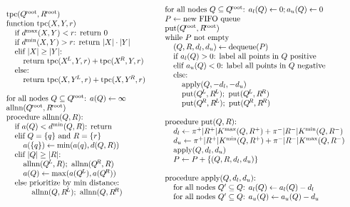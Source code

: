 \documentclass{article}
\newcommand{\disthrectmin}{d^{\min}}
\newcommand{\disthrectmax}{d^{\max}}
\newcommand{\dist}[2]{d(#1,#2)}
\newcommand{\kdroot}[1]{#1^{\!\text{root}}}
\newcommand{\kdleft}[1]{#1^{\!L}}
\newcommand{\kdright}[1]{#1^{\!R}}
\newcommand{\al}{a_l}
\newcommand{\au}{a_u}
\newcommand{\dl}{d_l}
\newcommand{\du}{d_u}
\newcommand{\x}{\\ \hspace{0.15in}}
\newcommand{\xx}{\\ \hspace{0.3in}}
\newcommand{\xxx}{\\ \hspace{0.45in}}
\begin{document}
\begin{equation*}
\begin{array}{ll}
  \begin{array}{l}
     \begin{array}{l}
      \text{tpc}(\kdroot{Q}, \kdroot{R})
      \\ \text{function tpc}(X, Y, r)
      \x \text{if }\disthrectmax(X, Y) < r\text{: return }0
      \x \text{if }\disthrectmin(X, Y) > r\text{: return } |X| \cdot |Y|
      \x \text{elif }|X| \geq |Y|\text{:}
      \xx \text{return tpc}(\kdleft{X}, Y, r) + \text{tpc}(\kdright{X}, Y, r)
      \x \text{else:}
      \xx \text{return tpc}(X, \kdleft{Y}, r) + \text{tpc}(X, \kdright{Y}, r)
    \end{array}
    \\
    \\
    \begin{array}{l}
      \text{for all nodes }Q \subseteq \kdroot{Q}\text{: }a(Q) \gets \infty
      \\ \text{allnn}(\kdroot{Q}, \kdroot{R})
      \\ \text{procedure allnn}(Q,R)\text{:}
      \x \text{if }a(Q) < \disthrectmin(Q, R)\text{: return}
      \x \text{elif }Q = \{q\} \text{ and } R = \{r\}
      \xx a(\{q\}) \gets \min(a(q), \dist{Q}{R})
      \x \text{elif }|Q| \geq |R|\text{:}
      \xx \text{allnn}(\kdleft{Q}, R); \text{ allnn}(\kdright{Q}, R)
      \xx a(Q) \gets \max(a(\kdleft{Q}), a(\kdright{Q}))
      \x \text{else prioritize by min distance:}
      \xxx \text{allnn}(Q, \kdleft{R}); \text{ allnn}(Q, \kdright{R})
    \end{array}
  \end{array}
  &
  \begin{array}{l}
    \text{for all nodes }Q \subseteq \kdroot{Q}\text{: }\al(Q) \gets 0; \au(Q) \gets 0
    \\ P \gets \text{new FIFO queue}
    \\ \text{put}(\kdroot{Q}, \kdroot{R})
    \\ \text{while } P \text{ not empty}
    \x (Q, R, \dl, \du) \gets \text{dequeue}(P)
    \x \text{if }\al(Q) > 0\text{: label all points in }Q\text{ positive}
    \x \text{elif }\au(Q) < 0\text{: label all points in }Q\text{ negative}
    \x \text{else:}
    \xx \text{apply}(Q, -\dl, -\du)
    \xx \text{put}(\kdleft{Q}, \kdleft{R}); \text{ put}(\kdleft{Q}, \kdright{R})
    \xx \text{put}(\kdright{Q}, \kdleft{R}); \text{ put}(\kdright{Q}, \kdright{R})
    \\
    \\ \text{procedure put}(Q, R)\text{:}
    \x \dl \gets \pi^+|R^+|K^{\max}(Q, R^+) + \pi^-|R^-|K^{\min}(Q, R^-)
    \x \du \gets \pi^+|R^+|K^{\min}(Q, R^+) + \pi^-|R^-|K^{\max}(Q, R^-)
    \x \text{apply}(Q, \dl, \du)
    \x P \gets P + \{(Q, R, \dl, \du)\}
    \\
    \\ \text{procedure apply}(Q, \dl, \du)\text{:}
    \x \text{for all nodes }Q' \subseteq Q\text{: } \al(Q) \gets \al(Q) - \dl
    \x \text{for all nodes }Q' \subseteq Q\text{: } \au(Q) \gets \au(Q) - \du
  \end{array}
\end{array}
\end{equation*}
\end{document}
